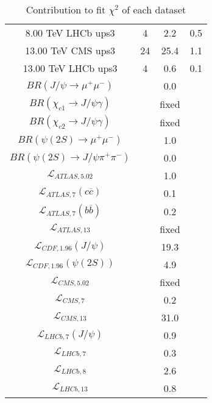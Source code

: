 \begin{table}[h!]
\begin{tabular}{c|c|c|c}
8.00 TeV LHCb ups3 & 4 & 2.2 & 0.5 \\
13.00 TeV CMS ups3 & 24 & 25.4 & 1.1 \\
13.00 TeV LHCb ups3 & 4 & 0.6 & 0.1 \\
\hline
$BR(J/\psi\rightarrow\mu^+\mu^-)$ &  & 0.0 &  \\
$BR(\chi_{c1}\rightarrow J/\psi\gamma)$ &  & fixed & \\
$BR(\chi_{c2}\rightarrow J/\psi\gamma)$ &  & fixed & \\
$BR(\psi(2S)\rightarrow\mu^+\mu^-)$ &  & 1.0 &  \\
$BR(\psi(2S)\rightarrow J/\psi\pi^+\pi^-)$ &  & 0.0 &  \\
$\mathcal L_{ATLAS,5.02}$ &  & 1.0 &  \\
$\mathcal L_{ATLAS,7}(c\overline c)$ &  & 0.1 &  \\
$\mathcal L_{ATLAS,7}(b\overline b)$ &  & 0.2 &  \\
$\mathcal L_{ATLAS,13}$ &  & fixed & \\
$\mathcal L_{CDF,1.96}(J/\psi)$ &  & 19.3 &  \\
$\mathcal L_{CDF,1.96}(\psi(2S))$ &  & 4.9 &  \\
$\mathcal L_{CMS,5.02}$ &  & fixed & \\
$\mathcal L_{CMS,7}$ &  & 0.2 &  \\
$\mathcal L_{CMS,13}$ &  & 31.0 &  \\
$\mathcal L_{LHCb,7}(J/\psi)$ &  & 0.9 &  \\
$\mathcal L_{LHCb,7}$ &  & 0.3 &  \\
$\mathcal L_{LHCb,8}$ &  & 2.6 &  \\
$\mathcal L_{LHCb,13}$ &  & 0.8 &  \\
\end{tabular}
\caption{Contribution to fit $\chi^2$ of each dataset}
\end{table}
